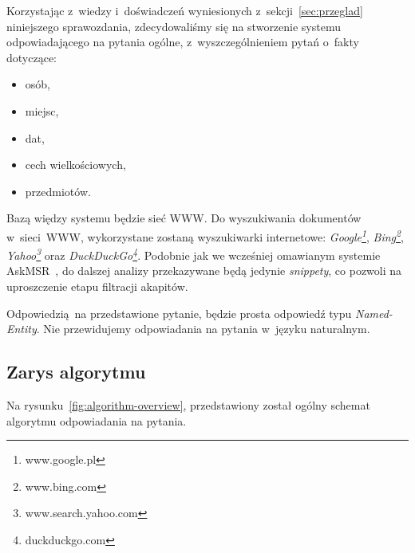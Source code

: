 Korzystając z~wiedzy i~doświadczeń wyniesionych z~sekcji~\ref{sec:przeglad} niniejszego sprawozdania, zdecydowaliśmy się na stworzenie systemu odpowiadającego na pytania ogólne, z~wyszczególnieniem pytań o~fakty dotyczące:
\begin{itemize}
    \item osób,
    \item miejsc,
    \item dat,
    \item cech wielkościowych,
    \item przedmiotów.
\end{itemize}

Bazą więdzy systemu będzie sieć WWW. Do wyszukiwania dokumentów w~sieci~WWW, wykorzystane zostaną wyszukiwarki internetowe: \emph{Google\footnote{www.google.pl}}, \emph{Bing\footnote{www.bing.com}}, \emph{Yahoo\footnote{www.search.yahoo.com}} oraz \emph{DuckDuckGo\footnote{duckduckgo.com}}. Podobnie jak we wcześniej omawianym systemie AskMSR~\cite{brill2002analysis}, do dalszej analizy przekazywane będą jedynie \emph{snippety}, co pozwoli na uproszczenie etapu filtracji akapitów.

Odpowiedzią na przedstawione pytanie, będzie prosta odpowiedź typu \emph{Named-Entity}. Nie przewidujemy odpowiadania na pytania w~języku naturalnym.

\subsection{Zarys algorytmu}
Na rysunku~\ref{fig:algorithm-overview}, przedstawiony został ogólny schemat algorytmu odpowiadania na pytania.

